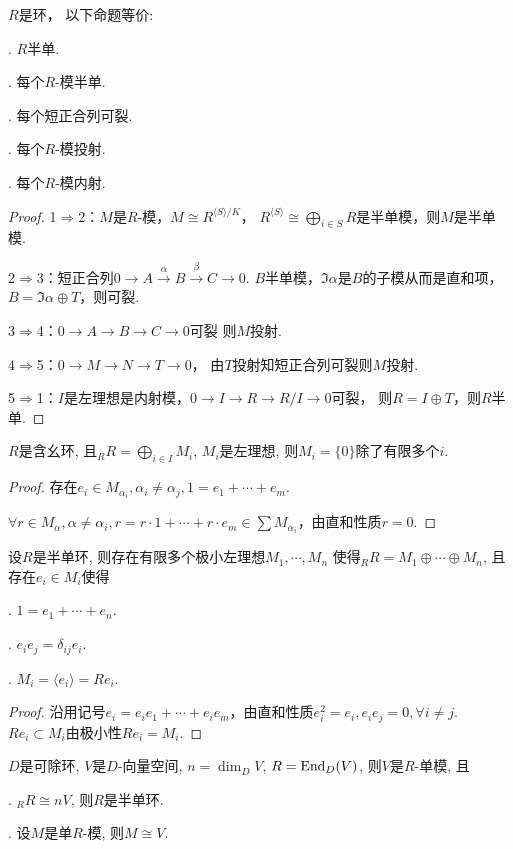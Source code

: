 \begin{proposition}
    $R$是环， 以下命题等价:\par
    . $R$半单.\par
    . 每个$R$-模半单.\par
    . 每个短正合列可裂.\par
    . 每个$R$-模投射.\par
    . 每个$R$-模内射.
\end{proposition}
\begin{proof}
1$\Rightarrow$2：$M$是$R$-模，$M\cong R^{\langle S\rangle/K}$，
$R^{\langle S\rangle}\cong \bigoplus\limits_{i\in S}R$是半单模，则$M$是半单模.

2$\Rightarrow$3：短正合列$0\rightarrow A\xrightarrow{\alpha}B
\xrightarrow{\beta}C\rightarrow 0$.
$B$半单模，$\Im \alpha$是$B$的子模从而是直和项，$B=\Im\alpha\oplus T$，则可裂.

3$\Rightarrow$4：$0\rightarrow A\rightarrow B\rightarrow C\rightarrow 0$可裂
则$M$投射.

4$\Rightarrow$5：$0\rightarrow M\rightarrow N\rightarrow T\rightarrow 0$，
由$T$投射知短正合列可裂则$M$投射.

5$\Rightarrow$1：$I$是左理想是内射模，$0\rightarrow I \rightarrow R\rightarrow R/I\rightarrow 0$可裂，
则$R=I\oplus T$，则$R$半单.
\end{proof}
\begin{proposition}
    $R$是含幺环, 且$_RR=\bigoplus\limits_{i\in I}M_i$, $M_i$是左理想, 
    则$M_i=\{0\}$除了有限多个$i$.
\end{proposition}
\begin{proof}
存在$e_i\in M_{\alpha _i},\alpha_i\neq \alpha_j ,1=e_1+\cdots+e_m$.

$\forall r\in M_{\alpha},\alpha\neq \alpha_i,
r=r\cdot1+\cdots+r\cdot e_m\in \sum M_{\alpha_i}$，由直和性质$r=0$.
\end{proof}
\begin{corollary}
    设$R$是半单环, 则存在有限多个极小左理想$M_1,\cdots,M_n$
    使得$_RR=M_1\oplus \cdots \oplus M_n$, 且存在$e_i\in M_i$使得\par
    . $1=e_1+\cdots+e_n$.\par
    . $e_ie_j=\delta_{ij}e_i$.\par
    . $M_i=\langle e_i\rangle=Re_i$.
\end{corollary}
\begin{proof}
沿用记号$e_i=e_ie_1+\cdots+e_ie_m$，由直和性质$e_i^2=e_i,e_ie_j=0,\forall i\neq j$.
$Re_i\subset M_i$由极小性$Re_i= M_i$.
\end{proof}
\begin{proposition}
    $D$是可除环, $V$是$D$-向量空间, $n=\dim_D V$, 
    $R=\operatorname{End}_D(V)$, 则$V$是$R$-单模, 且\par
    . $_RR\cong nV$, 则$R$是半单环.\par
    . 设$M$是单$R$-模, 则$M\cong V$.
\end{proposition}

